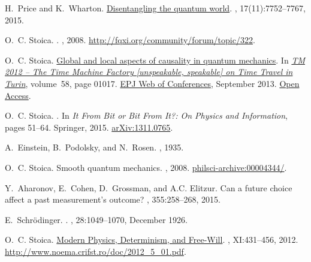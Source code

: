\documentclass[11pt]{amsart}
\theoremstyle{definition}
\theoremstyle{plain}
\begin{document}
\begin{thebibliography}{10}
H.~Price and K.~Wharton.
\newblock \href{http://www.mdpi.com/1099-4300/17/11/7752/htm}{Disentangling the
  quantum world}.
, 17(11):7752--7767, 2015.

O.~C. {Stoica}.
.
, 2008.
\newblock
  \href{http://fqxi.org/community/forum/topic/322}{http://fqxi.org/community/forum/topic/322}.

O.~C. Stoica.
\newblock \href{http://dx.doi.org/10.1051/epjconf/20135801017}{Global and local
  aspects of causality in quantum mechanics}.
\newblock In {\em \href{http://timemachine.polito.it/home/?q=node/2}{TM 2012 --
  The Time Machine Factory [unspeakable, speakable] on Time Travel in Turin}},
  volume~58, page 01017.
  \href{http://www.epj-conferences.org/index.php?option=com_toc&url=/articles/epjconf/abs/2013/19/contents/contents.html}{EPJ
  Web of Conferences}, September 2013.
\newblock \href{http://dx.doi.org/10.1051/epjconf/20135801017}{Open Access}.

O.~C. Stoica.
.
\newblock In {\em {It From Bit or Bit From It?: On Physics and Information}},
  pages 51--64. Springer, 2015.
\newblock \href{http://arxiv.org/abs/1311.0765}{arXiv:1311.0765}.

A.~Einstein, B.~Podolsky, and N.~Rosen.
, 1935.

O.~C. {Stoica}.
\newblock Smooth quantum mechanics.
, 2008.
\newblock
  \href{http://philsci-archive.pitt.edu/archive/00004344/}{philsci-archive:00004344/}.

Y.~Aharonov, E.~Cohen, D.~Grossman, and A.C. Elitzur.
\newblock Can a future choice affect a past measurement’s outcome?
, 355:258--268, 2015.

E.~Schr\"odinger.
.
, 28:1049--1070, December 1926.

O.~C. Stoica.
\newblock \href{http://www.noema.crifst.ro/doc/2012_5_01.pdf}{Modern Physics,
  Determinism, and Free-Will}.
, XI:431--456, 2012.
\newblock
  \href{http://www.noema.crifst.ro/doc/2012_5_01.pdf}{http://www.noema.crifst.ro/doc/2012\_5\_01.pdf}.


\end{thebibliography}
\end{document}

